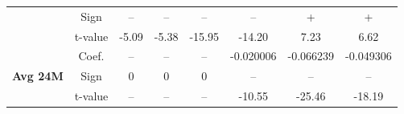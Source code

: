 \documentclass[11pt,english,a4paper,hidelinks]{book}
\begin{document}
\begin{table}[H]
\begin{tabular}{lccccccc}
            & Sign    & –         & –         & –         & –         & +         & +         \\
            & t-value & -5.09     & -5.38     & -15.95    & -14.20    & 7.23      & 6.62      \\
        \cmidrule{1-8}
        \multirow{3}{*}{\textbf{Avg 24M}}
            & Coef.   & --        & --        & --        & -0.020006 & -0.066239 & -0.049306 \\
            & Sign    & 0         & 0         & 0         & –         & –         & –         \\
            & t-value & --        & --        & --        & -10.55    & -25.46    & -18.19    \\
        \bottomrule
    \end{tabular}
    \label{tab:value_windowed_reformat}
\end{table}
\end{document}
